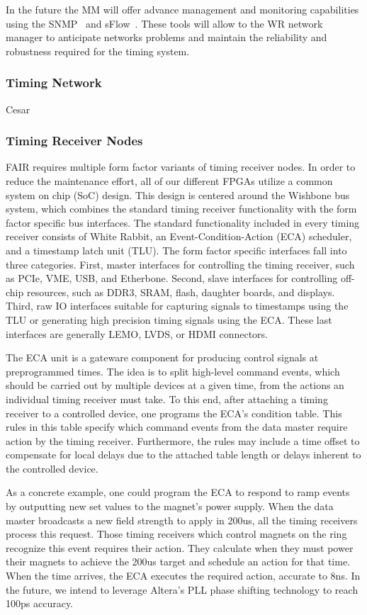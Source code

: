 In the future the MM will offer advance management and monitoring capabilities
using the SNMP~\cite{snmp} and sFlow~\cite{sflow}. These tools will allow to the 
WR network manager to anticipate networks problems and maintain the reliability
and robustness required for the timing system.


\subsubsection{Timing Network}

Cesar

\subsubsection{Timing Receiver Nodes}

FAIR requires multiple form factor variants of timing receiver nodes.
In order to reduce the maintenance effort,
all of our different FPGAs utilize a common system on chip (SoC) design.
This design is centered around the Wishbone bus system,
which combines the standard timing receiver functionality with 
the form factor specific bus interfaces.
The standard functionality included in every timing receiver
consists of White Rabbit, an Event-Condition-Action (ECA) scheduler,
and a timestamp latch unit (TLU).
The form factor specific interfaces fall into three categories.
First, master interfaces for controlling the timing receiver,
such as PCIe, VME, USB, and Etherbone.
Second, slave interfaces for controlling off-chip resources,
such as DDR3, SRAM, flash, daughter boards, and displays.
Third, raw IO interfaces suitable for capturing signals to 
timestamps using the TLU or generating high precision timing
signals using the ECA.
These last interfaces are generally LEMO, LVDS, or HDMI connectors.

The ECA unit is a gateware component for producing control
signals at preprogrammed times.
The idea is to split high-level command events,
which should be carried out by multiple devices at a given time,
from the actions an individual timing receiver must take.
To this end, 
after attaching a timing receiver to a controlled device,
one programs the ECA's condition table.
This rules in this table 
specify which command events from the data master
require action by the timing receiver.
Furthermore, the rules may include a time offset to compensate 
for local delays due to the attached table length or delays
inherent to the controlled device.

As a concrete example, 
one could program the ECA to respond to ramp events
by outputting new set values to the magnet's power supply.
When the data master broadcasts a new field strength to apply in 200us,
all the timing receivers process this request.
Those timing receivers which control magnets on the ring
recognize this event requires their action.
They calculate when they must power their magnets to achieve
the 200us target and schedule an action for that time.
When the time arrives, the ECA executes the required action,
accurate to 8ns.
In the future,
we intend to leverage Altera's PLL phase shifting technology 
to reach 100ps accuracy.


